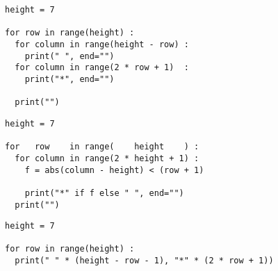 \begin{frame}[fragile]
%
\begin{tcbraster}[raster columns=2,
                  raster equal height,
                  nobeforeafter,
                  raster column skip=0.5cm]
\begin{codebox}
\begin{verbatim}
height = 7

for row in range(height) :
  for column in range(height - row) :
    print(" ", end="")
  for column in range(2 * row + 1)  :
    print("*", end="")
  
  print("")
\end{verbatim}
\end{codebox}
%
\begin{codebox}
\begin{verbatim}
height = 7

for   row    in range(    height    ) :
  for column in range(2 * height + 1) :
    f = abs(column - height) < (row + 1)
    
    print("*" if f else " ", end="")
  print("")
\end{verbatim}
\end{codebox}
\end{tcbraster}
%
\begin{codebox}
\begin{verbatim}
height = 7

for row in range(height) :
  print(" " * (height - row - 1), "*" * (2 * row + 1))
\end{verbatim}
\end{codebox}
%
\end{frame}



